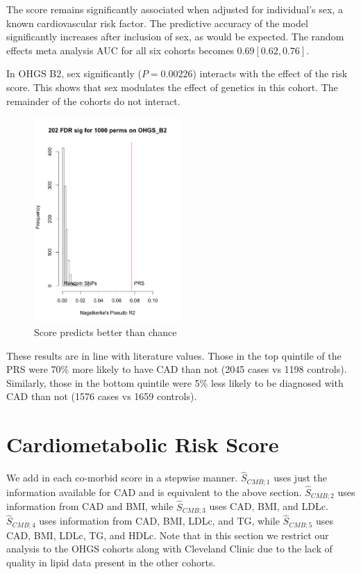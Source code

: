The score remains significantly associated when adjusted for individual's sex, a known cardiovascular risk factor. The predictive accuracy of the model significantly increases after inclusion of sex, as would be expected. The random effects meta analysis \ac{AUC} for all six cohorts becomes $0.69[0.62, 0.76]$. 

In \ac{OHGS} B2, sex significantly ($P = 0.00226$) interacts with the effect of the risk score. This shows that sex modulates the effect of genetics in this cohort. The remainder of the cohorts do not interact.


\begin{figure}[H]
\label{b2_perm}
\caption{Score predicts better than chance}
\centering
\includegraphics[width=0.5\textwidth]{Figures/b2.png}
\end{figure}

These results are in line with literature values. Those in the top quintile of the \ac{PRS} were 70\% more likely to have \ac{CAD} than not (2045 cases vs 1198 controls). Similarly, those in the bottom quintile were  5\% less likely to be diagnosed with \ac{CAD} than not (1576 cases vs 1659 controls).



\section{Cardiometabolic Risk Score}

We add in each co-morbid score in a stepwise manner. $\hat{S}_{CMB; 1}$ uses just the information available for CAD and is equivalent to the above section.  $\hat{S}_{CMB; 2}$ uses information from CAD and BMI, while $\hat{S}_{CMB; 3}$ uses CAD, BMI, and LDLc. $\hat{S}_{CMB; 4}$ uses information from CAD, BMI, LDLc, and TG, while $\hat{S}_{CMB; 5}$ uses CAD, BMI, LDLc, TG, and HDLc. Note that in this section we restrict our analysis to the \ac{OHGS} cohorts along with Cleveland Clinic due to the lack of quality in lipid data present in the other cohorts. 

